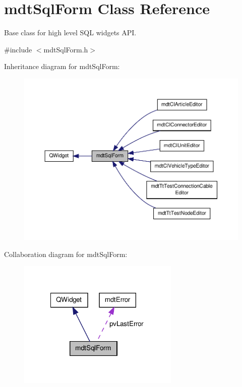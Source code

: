 \hypertarget{classmdt_sql_form}{\section{mdt\-Sql\-Form Class Reference}
\label{classmdt_sql_form}
}


Base class for high level S\-Q\-L widgets A\-P\-I.  




{\ttfamily \#include $<$mdt\-Sql\-Form.\-h$>$}



Inheritance diagram for mdt\-Sql\-Form\-:\nopagebreak
\begin{figure}[H]
\begin{center}
\leavevmode
\includegraphics[width=350pt]{classmdt_sql_form__inherit__graph}
\end{center}
\end{figure}


Collaboration diagram for mdt\-Sql\-Form\-:\nopagebreak
\begin{figure}[H]
\begin{center}
\leavevmode
\includegraphics[width=218pt]{classmdt_sql_form__coll__graph}
\end{center}
\end{figure}
